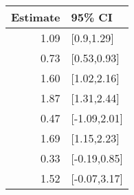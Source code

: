 \begin{tabular}{rl}
  \hline
Estimate & 95\% CI \\ 
  \hline
1.09 & [0.9,1.29] \\ 
  0.73 & [0.53,0.93] \\ 
  1.60 & [1.02,2.16] \\ 
  1.87 & [1.31,2.44] \\ 
  0.47 & [-1.09,2.01] \\ 
  1.69 & [1.15,2.23] \\ 
  0.33 & [-0.19,0.85] \\ 
  1.52 & [-0.07,3.17] \\ 
   \hline
\end{tabular}

